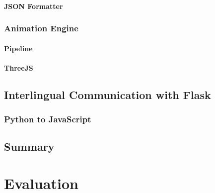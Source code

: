 \documentclass[12pt]{ociamthesis}  %
\begin{document}
		\subsubsection{JSON Formatter}
	\subsection{Animation Engine}
		\subsubsection{Pipeline}
		\subsubsection{ThreeJS}
	
\section{Interlingual Communication with Flask}
	\subsection{Python to JavaScript}

\section{Summary}
			


\chapter{Evaluation}
\end{document}
